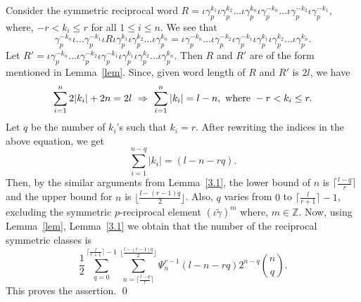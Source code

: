 \documentclass[11pt]{amsart}
\renewenvironment{proof}{{\bfseries Proof.}}{\qed}
\numberwithin{equation}{section}
\theoremstyle{definition}
\newcommand{\gt}{\tilde{\gamma}}
\newcommand{\tb}{\textbf}
\newcommand{\imp}{\Rightarrow}
\newcommand{\g}{\gamma_{p}}
\newcommand{\io}{\iota }
\newcommand{\lemref}[1]{Lemma~\ref{#1}}
\numberwithin{equation}{section}
\begin{document}
	\begin{proof}
			Consider the symmetric reciprocal word $ R= \io\g^{k_{1}}\io \g^{k_{2}}\dots \io \g^{k_{n}}\io \g^{-k_{n}}\dots\io \g^{-k_{2}}\io \g^{-k_{1}} $, where, $-r< k_{i}\leq r $ for all $1\leq i\leq n$. We see that 
			\[ \g^{-k_{n}}\io \dots \g^{-k_{1}}\io R\io\g^{k_{1}}\io \g^{k_{2}}\dots \io \g^{k_{n}}=\io \g^{-k_{n}}\dots\io \g^{-k_{2}}\io \g^{-k_{1}}\io\g^{k_{1}}\io \g^{k_{2}}\dots \io \g^{k_{n}} .\]
			Let  $R'=\io \g^{-k_{n}}\dots\io \g^{-k_{2}}\io \g^{-k_{1}}\io\g^{k_{1}}\io \g^{k_{2}}\dots \io \g^{k_{n}}$. Then 
			$ R $ and $ R' $ are of the form mentioned in \lemref{lem}. Since, given word length of $ R $ and  $ R' $ is $ 2l $, we have 
			\[\sum^n_{i=1} 2|k_i|+2n=2l ~\imp ~ \sum_{i=1}^{n} |k_{i}|=l-n, 		\hbox{ where } -r<k_{i}\leq r. \]
			Let $ q $ be the number of $ k_{i} $'s such that $k_i=r$. After rewriting the indices in the above equation, we get \[ \sum_{i=1}^{n-q} |k_{i}|=(l-n-rq). \]
			Then, by the similar arguments from \lemref{3.1},
			the lower bound of $ n $ is $ \lceil\frac{l-q}{r}\rceil $ and 
			the upper bound for $ n $ is $ \lfloor \frac{l-(r-1)q}{2}\rfloor $. Also, $ q $ varies from $ 0 $ to $\lceil\frac{l}{r+1}\rceil-1$, excluding the symmetric $ p $-reciprocal element $ (\io \gt)^{m} $ where, $ m\in \mathbb{Z} $. Now, using \lemref{lem}, \lemref{3.1} we obtain that the number of the reciprocal symmetric classes is  $$\frac{1}{2}\sum_{q=0}^{\lceil\frac{l}{r+1}\rceil-1} \sum_{n= \lceil\frac{l-q}{r}\rceil }^{\lfloor \frac{l-(r-1)q}{2}\rfloor}\Psi_{n}^{r-1}(l-n-rq)2^{n-q} {n \choose q}.$$
			This proves the assertion. 
		\end{proof}
		
\end{document}
